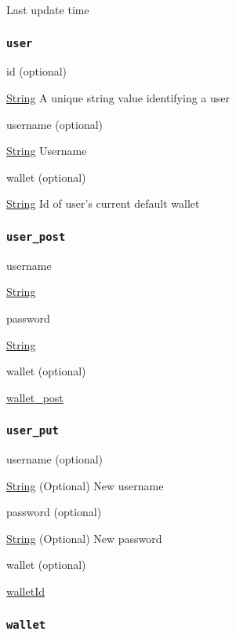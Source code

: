 Last update time

\hypertarget{user-2}{%
\subsubsection{\texorpdfstring{\protect\hypertarget{user}{}{\texttt{user}}}{user}}\label{user-2}}

id (optional)

{\protect\hyperlink{string}{String}} A unique string value identifying a
user

username (optional)

{\protect\hyperlink{string}{String}} Username

wallet (optional)

{\protect\hyperlink{string}{String}} Id of user's current default wallet

\hypertarget{user_post}{%
\subsubsection{\texorpdfstring{\protect\hypertarget{user_post}{}{\texttt{user\_post}}}{user\_post}}\label{user_post}}

username

{\protect\hyperlink{string}{String}}

password

{\protect\hyperlink{string}{String}}

wallet (optional)

{\protect\hyperlink{wallet_post}{wallet\_post}}

\hypertarget{user_put}{%
\subsubsection{\texorpdfstring{\protect\hypertarget{user_put}{}{\texttt{user\_put}}}{user\_put}}\label{user_put}}

username (optional)

{\protect\hyperlink{string}{String}} (Optional) New username

password (optional)

{\protect\hyperlink{string}{String}} (Optional) New password

wallet (optional)

{\protect\hyperlink{walletId}{walletId}}

\hypertarget{wallet-2}{%
\subsubsection{\texorpdfstring{\protect\hypertarget{wallet}{}{\texttt{wallet}}}{wallet}}\label{wallet-2}}

